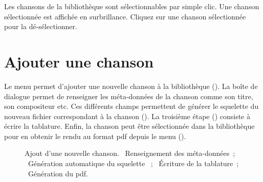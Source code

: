Les chansons de la bibliothèque sont sélectionnables par simple clic.
Une chanson sélectionnée est affichée en surbrillance. Cliquez sur une
chanson sélectionnée pour la dé-sélectionner.

\section{Ajouter une chanson}

Le menu  permet d'ajouter une
nouvelle chanson à la bibliothèque (). La boîte
de dialogue permet de renseigner les méta-données de la chanson comme
son titre, son compositeur etc. Ces différents champs permettent de
générer le squelette du nouveau fichier  correspondant à la
chanson (). La troisième étape
() consiste à écrire la tablature. Enfin, la
chanson peut être sélectionnée dans la bibliothèque pour en obtenir le
rendu au format pdf depuis le menu 
().

\begin{figure}
  \centering
  \hspace{0.1cm}%
  \hspace{0.1cm}%
  \hspace{0.1cm}%
  \caption{%
    Ajout d'une nouvelle chanson.
    ~Renseignement des méta-données~; %
    ~Génération automatique du squelette ~; %
    ~Écriture de la tablature~; %
    ~Génération du pdf.%
  }%
  \label{fig:new-song}
\end{figure}


